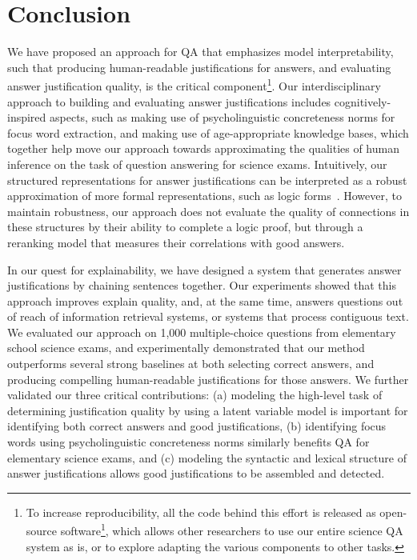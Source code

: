 \section{Conclusion}
\label{sec-cl2017:conclusion}

We have proposed an approach for QA that emphasizes model interpretability, such that producing human-readable justifications for answers, and evaluating answer justification quality, is the critical component\footnote{To increase reproducibility, all the code behind this effort is released as open-source software\footnote{\url{https://github.com/clulab/releases/tree/master/cl2017-qa}}, which allows other researchers to use our entire science QA system as is, or to explore adapting the various components to other tasks. }.
Our interdisciplinary approach to building and evaluating answer justifications includes cognitively-inspired aspects, such as making use of psycholinguistic concreteness norms for focus word extraction, and making use of age-appropriate knowledge bases, which together help move our approach towards approximating the qualities of human inference on the task of question answering for science exams. Intuitively, our structured representations for answer justifications can be interpreted as a robust approximation of more formal representations, such as logic forms~\citep{moldovan2001logic}. However, to maintain robustness, our approach does not evaluate the quality of connections in these structures by their ability to complete a logic proof, but through a reranking model that measures their correlations with good answers.

In our quest for explainability, we have designed a system that generates answer justifications by chaining sentences together. Our experiments showed that this approach improves explain quality, and, at the same time, answers questions out of reach of information retrieval systems, or systems that process contiguous text.  
We evaluated our approach on 1,000 multiple-choice questions from elementary school science exams, and experimentally demonstrated that our method outperforms several strong baselines at both selecting correct answers, and producing compelling human-readable justifications for those answers.  We further validated our three critical contributions: (a) modeling the high-level task of determining justification quality by using a latent variable model is important for identifying both correct answers and good justifications, (b) identifying focus words using psycholinguistic concreteness norms similarly benefits QA for elementary science exams, and (c) modeling the syntactic and lexical structure of answer justifications allows good justifications to be assembled and detected. 

